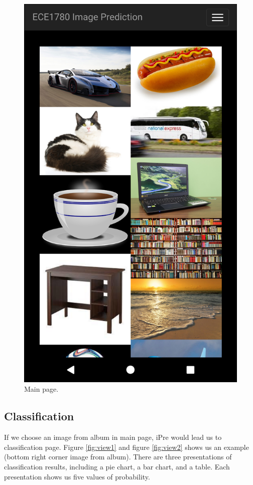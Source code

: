 \documentclass[conference]{IEEEtran}
\begin{document}
\begin{figure}[h!]
  \centering
  \includegraphics[height=\linewidth]{main.png}
  \caption{Main page.}
  \label{fig:main}
\end{figure}

\subsection{Classification}
If we choose an image from album in main page, iPre would lead us to classification page. Figure \ref{fig:view1} and figure \ref{fig:view2} shows us an example (bottom right corner image from album). There are three presentations of classification results, including a pie chart, a bar chart, and a table. Each presentation shows us five values of probability.
\end{document}

